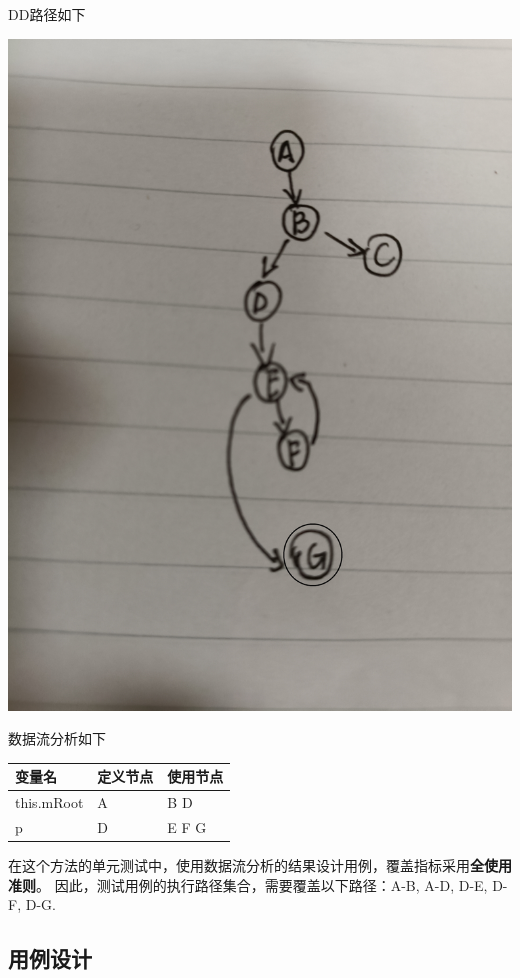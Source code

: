 \documentclass[12pt, a4paper, oneside]{ctexart}
\begin{document}
DD路径如下

\includegraphics[scale=0.06]{screenshots/DD-minimum.jpg}

数据流分析如下

\begin{table}[!h]
    \begin{tabular}{|l|l|l|}
    \hline
    变量名 & 定义节点 & 使用节点 \\ \hline
    this.mRoot & A & B D\\ \hline
    p & D & E F G \\ \hline
    \end{tabular}
\end{table}

在这个方法的单元测试中，使用数据流分析的结果设计用例，覆盖指标采用\textbf{全使用准则}。
因此，测试用例的执行路径集合，需要覆盖以下路径：A-B, A-D, D-E, D-F, D-G.

\subsection{用例设计}
\end{document}

